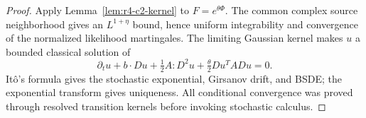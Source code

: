 \begin{proof}
Apply Lemma~\ref{lem:r4-c2-kernel} to
\(F=e^{\theta\Phi}\).  The common complex source neighborhood gives an
\(L^{1+\eta}\) bound, hence uniform integrability and convergence of the
normalized likelihood martingales.  The limiting Gaussian kernel makes \(u\)
a bounded classical solution of
\[
 \partial_tu+b\cdot Du+\tfrac12A:D^2u+
 \tfrac\theta2Du^TADu=0.
\]
It\^o's formula gives the stochastic exponential, Girsanov drift, and BSDE;
the exponential transform gives uniqueness.  All conditional convergence was
proved through resolved transition kernels before invoking stochastic
calculus.
\end{proof}
